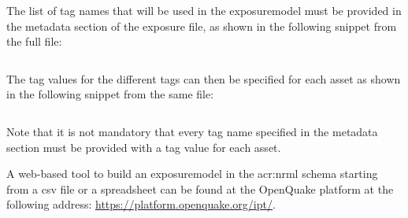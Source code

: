 The list of tag names that will be used in the \gls{exposuremodel} must be provided
in the metadata section of the exposure file, as shown in the following snippet
from the full file:

\inputminted[firstline=17,firstnumber=17,lastline=17,fontsize=\footnotesize,frame=single,linenos,bgcolor=lightgray]{xml}{oqum/risk/verbatim/input_exposure_tags.xml}

The \gls{tag} values for the different \glspl{tag} can then be specified for
each \gls{asset} as shown in the following snippet from the same file:

\inputminted[firstline=28,firstnumber=28,lastline=29,fontsize=\footnotesize,frame=single,linenos,bgcolor=lightgray]{xml}{oqum/risk/verbatim/input_exposure_tags.xml}

Note that it is not mandatory that every \gls{tag} name specified in the metadata
section must be provided with a \gls{tag} value for each \gls{asset}. 

A web-based tool to build an \gls{exposuremodel} in the \gls{acr:nrml} schema
starting from a csv file or a spreadsheet can be found at the OpenQuake platform at the
following address: \href{https://platform.openquake.org/ipt/}{https://platform.openquake.org/ipt/}.
